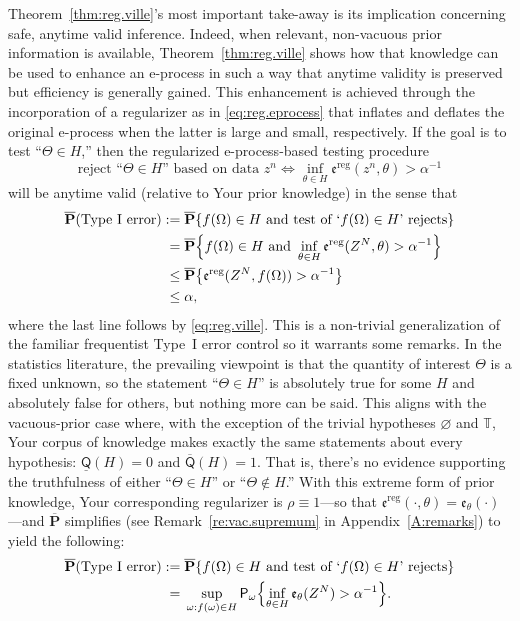 \documentclass[a4paper, 12pt]{article}
\theoremstyle{plain}
\theoremstyle{definition}
\theoremstyle{remark}
\newcommand{\prob}{\mathsf{P}}
\newcommand{\TT}{\mathbb{T}}
\newcommand{\lprior}{\underline{\mathsf{Q}}}
\newcommand{\uprior}{\overline{\mathsf{Q}}}
\newcommand{\uuprob}{\mathbf{\overline{P}}}
\newcommand{\eval}{\mathfrak{e}}
\begin{document}
Theorem~\ref{thm:reg.ville}'s most important take-away is its implication concerning safe, anytime valid inference.  Indeed, when relevant, non-vacuous prior information is available,  Theorem~\ref{thm:reg.ville} shows how that knowledge can be used to enhance an e-process in such a way that anytime validity is preserved but efficiency is generally gained.  This enhancement is achieved through the incorporation of a regularizer as in \eqref{eq:reg.eprocess} that inflates and deflates the original e-process when the latter is large and small, respectively.  If the goal is to test ``$\Theta \in H$,'' then the regularized e-process-based testing procedure  
\[ \text{reject ``$\Theta \in H$'' based on data $z^n$} \iff \inf_{\theta \in H} \eval^\text{reg}(z^n,\theta) > \alpha^{-1} \]
will be anytime valid (relative to Your prior knowledge) in the sense that 
\begin{align*}
\uuprob(\text{Type~I error}) := & \; \uuprob\{ \text{$f(\Omega) \in H$ and test of `$f(\Omega) \in H$' rejects} \} \\
= & \; \uuprob\Bigl\{ f(\Omega) \in H \text{ and } \inf_{\theta \in H} \eval^\text{reg}(Z^N,\theta) > \alpha^{-1} \Bigr\} \\
\leq & \; \uuprob\bigl\{ \eval^\text{reg}(Z^N,f(\Omega)) > \alpha^{-1} \bigr\} \\
\leq & \; \alpha,
\end{align*}
where the last line follows by \eqref{eq:reg.ville}.  This is a non-trivial generalization of the familiar frequentist Type~I error control so it warrants some remarks.  In the statistics literature, the prevailing viewpoint is that the quantity of interest $\Theta$ is a fixed unknown, so the statement ``$\Theta \in H$'' is absolutely true for some $H$ and absolutely false for others, but nothing more can be said.  This aligns with the vacuous-prior case where, with the exception of the trivial hypotheses $\varnothing$ and $\TT$, Your corpus of knowledge makes exactly the same statements about every hypothesis: $\lprior(H) = 0$ and $\uprior(H)=1$.  That is, there's no evidence supporting the truthfulness of either ``$\Theta \in H$'' or ``$\Theta \not\in H$.'' With this extreme form of prior knowledge, Your corresponding regularizer is $\rho \equiv 1$---so that $\eval^\text{reg}(\cdot, \theta) = \eval_\theta(\cdot)$---and $\uuprob$ simplifies (see Remark~\ref{re:vac.supremum} in Appendix~\ref{A:remarks}) to yield the following:
\begin{align}
\uuprob(\text{Type~I error}) := & \; \uuprob\{ \text{$f(\Omega) \in H$ and test of `$f(\Omega) \in H$' rejects}\} \notag \\
= & \; \sup_{\omega: f(\omega) \in H} \prob_\omega \Bigl\{ \inf_{\theta \in H} \eval_\theta(Z^N) > \alpha^{-1} \Bigr\} \label{eq:vac.supremum}. 
\end{align}
\end{document}
